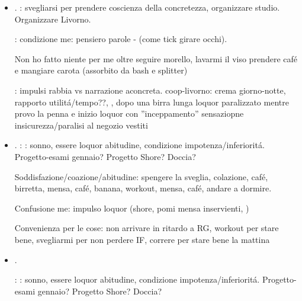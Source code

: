 \begin{itemize}
Alle dieci di mattina per corsa:  come salire le scale,  dopo 10 minuti (tosse asmatica circa 30 min).

Chiedo a Bolognesi di accendere la luce ...
Dopo le carote comincio ad avere bruciore di stomaco/sonnolenza-noia dopo pranzo.
Pranzo/cena: mangiare come rifugio - subisco nel punto debole senza aver preparato difesa: paralisi-impotenza.
telefono mamma/babbo: babbo che non capisce/madreche non ascolta - 
dopo cena e caf\'e non ricordo cosa \'e meglio studiare: .

\item {}.
: svegliarsi per prendere coscienza della concretezza, organizzare studio. Organizzare Livorno.

: condizione me: pensiero parole - (come tick girare occhi).

Non ho fatto niente per me oltre seguire morello, lavarmi il viso prendere caf\'e e mangiare carota (assorbito da bash e splitter)

: impulsi rabbia vs narrazione aconcreta.
coop-livorno: crema giorno-notte, rapporto utilit\'a/tempo??, , dopo una birra lunga loquor paralizzato mentre provo la penna e inizio loquor con ''inceppamento''
sensaziopne insicurezza/paralisi al negozio vestiti

\item {}.
: : sonno, essere loquor abitudine, condizione impotenza/inferiorit\'a. Progetto-esami gennaio? Progetto Shore? Doccia?

Soddisfazione/coazione/abitudine: spengere la sveglia, colazione, caf\'e, birretta, mensa,  caf\'e, banana, workout, mensa, caf\'e, andare a dormire.

Confusione me: impulso loquor (shore, pomi mensa inservienti, )

Convenienza per le cose: non arrivare in ritardo a RG, workout per stare bene, svegliarmi per non perdere IF, correre per stare bene la mattina

\item {}.

: : sonno, essere loquor abitudine, condizione impotenza/inferiorit\'a. Progetto-esami gennaio? Progetto Shore? Doccia?


\end{itemize}
